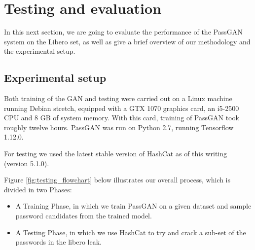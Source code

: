 \section{Testing and evaluation}\label{sec:testing_and_evaluation}
In this next section, we are going to evaluate the performance of the PassGAN system on the Libero set, as well as give a brief overview of our methodology and the experimental setup.

\subsection{Experimental setup}
Both training of the GAN and testing were carried out on a Linux machine running Debian stretch, equipped with a GTX 1070 graphics card, an i5-2500 CPU and 8 GB of system memory. 
With this card, training of PassGAN took roughly twelve hours.
PassGAN was run on Python 2.7, running Tensorflow 1.12.0.%

For testing we used the latest stable version of HashCat as of this writing (version 5.1.0). %

Figure \ref{fig:testing_flowchart} below illustrates our overall process, which is divided in two Phases: 
\begin{itemize}
    \item A Training Phase, in which we train PassGAN on a given dataset and sample password candidates from the trained model.
    \item A Testing Phase, in which we use HashCat to try and crack a sub-set of the passwords in the libero leak.
\end{itemize}

